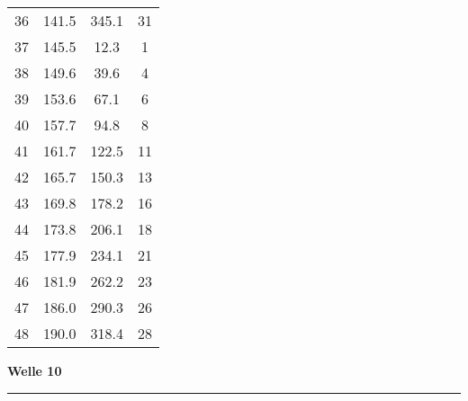 \documentclass[10pt, a4paper]{article}
\begin{document}
\begin{center}
\begin{tabular}{c|c|c|c}
		36 & 141.5 & 345.1 & 31 \\
		37 & 145.5 & 12.3 & 1 \\
		38 & 149.6 & 39.6 & 4 \\
		39 & 153.6 & 67.1 & 6 \\
		40 & 157.7 & 94.8 & 8 \\
		41 & 161.7 & 122.5 & 11 \\
		42 & 165.7 & 150.3 & 13 \\
		43 & 169.8 & 178.2 & 16 \\
		44 & 173.8 & 206.1 & 18 \\
		45 & 177.9 & 234.1 & 21 \\
		46 & 181.9 & 262.2 & 23 \\
		47 & 186.0 & 290.3 & 26 \\
		48 & 190.0 & 318.4 & 28 \\
	\end{tabular}
\end{center}
\newpage
\centerline{{\bf Welle 10} }
\rule{1.0\textwidth}{0.5mm}
\end{document}

